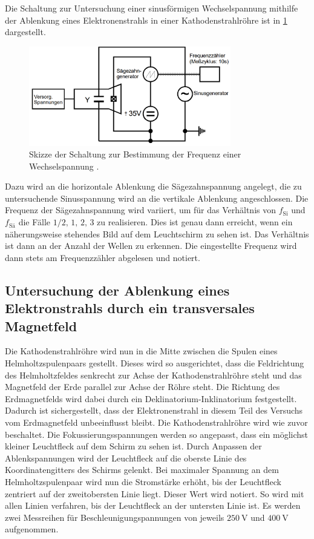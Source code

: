 Die Schaltung zur Untersuchung einer sinusförmigen Wechselspannung mithilfe der
Ablenkung eines Elektronenstrahls in einer Kathodenstrahlröhre ist in \ref{fig:schaltung2}
dargestellt.

\begin{figure}[H]
  \centering
  \includegraphics[width=250pt]{data/schaltung2.png}
  \caption{Skizze der Schaltung zur Bestimmung der Frequenz einer Wechselspannung \cite{Versuchsanleitung501}.}
  \label{fig:schaltung2}
\end{figure}

Dazu wird an die horizontale Ablenkung die Sägezahnspannung angelegt, die zu untersuchende
Sinusspannung wird an die vertikale Ablenkung angeschlossen.
Die Frequenz der Sägezahnspannung wird variiert, um für das Verhältnis von $f_\text{Si}$
und $f_\text{Sä}$ die Fälle $1/2 , \, 1, \, 2, \, 3$ zu realisieren.
Dies ist genau dann erreicht, wenn ein näherungsweise stehendes Bild auf dem Leuchtschirm
zu sehen ist. Das Verhältnis ist dann an der Anzahl der Wellen zu erkennen. Die eingestellte Frequenz
wird dann stets am Frequenzzähler abgelesen und notiert.

\subsection{Untersuchung der Ablenkung eines Elektronstrahls durch ein transversales Magnetfeld}
\label{subsec:daspraktikumistscheisse}
Die Kathodenstrahlröhre wird nun in die Mitte zwischen die Spulen eines Helmholtzspulenpaars
gestellt. Dieses wird so ausgerichtet, dass die Feldrichtung des Helmholtzfeldes
senkrecht zur Achse der Kathodenstrahlröhre steht und das Magnetfeld der Erde parallel
zur Achse der Röhre steht. Die Richtung des Erdmagnetfelds wird dabei durch ein Deklinatorium-Inklinatorium
festgestellt. Dadurch ist sichergestellt, dass der Elektronenstrahl in diesem Teil
des Versuchs vom Erdmagnetfeld unbeeinflusst bleibt. Die Kathodenstrahlröhre wird wie
zuvor beschaltet. Die Fokussierungsspannungen werden so angepasst, dass ein möglichst kleiner
Leuchtfleck auf dem Schirm zu sehen ist. Durch Anpassen der Ablenkspannungen wird
der Leuchtfleck auf die oberste Linie des Koordinatengitters des Schirms gelenkt.
Bei maximaler Spannung an dem Helmholtzspulenpaar wird nun die Stromstärke erhöht,
bis der Leuchtfleck zentriert auf der zweitobersten Linie liegt. Dieser Wert wird notiert.
So wird mit allen Linien verfahren, bis der Leuchtfleck an der untersten Linie ist.
Es werden zwei Messreihen für Beschleunigungspannungen von jeweils $\SI{250}{\volt}$ und
$\SI{400}{\volt}$ aufgenommen.
